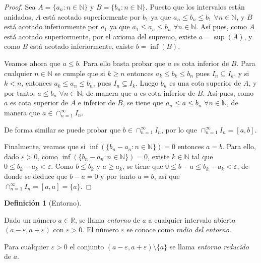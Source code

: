 \documentclass[
  a4paper,
]{scrreport}
\theoremstyle{definition}
\theoremstyle{plain}
\theoremstyle{definition}
\newtheorem{definition}{Definición}[chapter]
\theoremstyle{definition}
\theoremstyle{plain}
\theoremstyle{plain}
\theoremstyle{remark}
\begin{document}
\begin{tcolorbox}[enhanced jigsaw, leftrule=.75mm, colbacktitle=quarto-callout-note-color!10!white, toprule=.15mm, opacityback=0, opacitybacktitle=0.6, toptitle=1mm, breakable, bottomtitle=1mm, colframe=quarto-callout-note-color-frame, rightrule=.15mm, titlerule=0mm, title=\textcolor{quarto-callout-note-color}{\faInfo}\hspace{0.5em}{Demostración}, arc=.35mm, left=2mm, bottomrule=.15mm, colback=white, coltitle=black]

\begin{proof}
Sea \(A=\{a_n: n\in\mathbb{N}\}\) y \(B=\{b_n: n\in\mathbb{N}\}\).
Puesto que los intervalos están anidados, \(A\) está acotado
superiormente por \(b_1\) ya que \(a_n\leq b_n\leq b_1\)
\(\forall n\in \mathbb{N}\), y \(B\) está acotado inferiormente por
\(a_1\) ya que \(a_1\leq a_n\leq b_n\) \(\forall n\in \mathbb{N}\). Así
pues, como \(A\) está acotado superiormente, por el axioma del supremo,
existe \(a=\sup(A)\), y como \(B\) está acotado inferiormente, existe
\(b=\inf(B)\).

Veamos ahora que \(a\leq b\). Para ello basta probar que \(a\) es cota
inferior de \(B\). Para cualquier \(n\in\mathbb{N}\) se cumple que si
\(k\geq n\) entonces \(a_k\leq b_k\leq b_n\) pues \(I_n\subseteq I_k\),
y si \(k<n\), entonces \(a_k\leq a_n\leq b_n\), pues
\(I_n\subseteq I_k\). Luego \(b_n\) es una cota superior de \(A\), y por
tanto, \(a\leq b_n\) \(\forall n\in\mathbb{N}\), de manera que \(a\) es
cota inferior de \(B\). Así pues, como \(a\) es cota superior de \(A\) e
inferior de \(B\), se tiene que \(a_n\leq a\leq b_n\)
\(\forall n\in\mathbb{N}\), de manera que
\(a\in \cap_{n=1}^\infty I_n\).

De forma similar se puede probar que \(b\in \cap_{n=1}^\infty I_n\), por
lo que \(\cap_{n=1}^\infty I_n = [a,b]\).

Finalmente, veamos que si \(\inf(\{b_n-a_n: n\in \mathbb{N}\})=0\)
entonces \(a=b\). Para ello, dado \(\varepsilon>0\), como
\(\inf(\{b_n-a_n: n\in \mathbb{N}\})=0\), existe \(k\in\mathbb{N}\) tal
que \(0\leq b_k-a_k < \varepsilon\). Como \(b\leq b_k\) y \(a\geq a_k\),
se tiene que \(0\leq b-a\leq b_k-a_k < \varepsilon\), de donde se deduce
que \(b-a=0\) y por tanto \(a=b\), así que
\(\cap_{n=1}^\infty I_n = [a,a]=\{a\}\).
\end{proof}

\end{tcolorbox}

\begin{definition}[Entorno]\protect\hypertarget{def-entorno}{}\label{def-entorno}

Dado un número \(a\in \mathbb{R}\), se llama \emph{entorno} de \(a\) a
cualquier intervalo abierto \((a-\varepsilon, a+\varepsilon)\) con
\(\varepsilon>0\). El número \(\varepsilon\) se conoce como \emph{radio
del entorno}.

Para cualquier \(\varepsilon>0\) el conjunto
\((a-\varepsilon, a+\varepsilon)\setminus \{a\}\) se llama \emph{entorno
reducido} de \(a\).

\end{definition}
\end{document}
